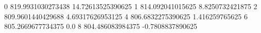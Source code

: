 0 819.9931030273438 14.72613525390625
1 814.092041015625 8.8250732421875
2 809.9601440429688 4.69317626953125
4 806.6832275390625 1.416259765625
6 805.2669677734375 0.0
8 804.486083984375 -0.7808837890625
